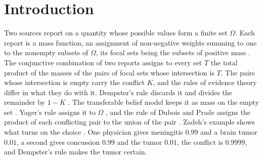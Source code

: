 \section{Introduction}\label{sec:intro}

Two sources report on a quantity whose possible values form a finite set $\Omega$. Each report is a mass function, an assignment of non-negative weights summing to one to the nonempty subsets of $\Omega$, its focal sets being the subsets of positive mass \cite{dempster1967, shafer1976}. The conjunctive combination of two reports assigns to every set $T$ the total product of the masses of the pairs of focal sets whose intersection is $T$. The pairs whose intersection is empty carry the conflict $K$, and the rules of evidence theory differ in what they do with it. Dempster's rule discards it and divides the remainder by $1 - K$ \cite{dempster1967, shafer1976}. The transferable belief model keeps it as mass on the empty set \cite{smets1994}. Yager's rule assigns it to $\Omega$ \cite{yager1987}, and the rule of Dubois and Prade assigns the product of each conflicting pair to the union of the pair \cite{dubois1988}. Zadeh's example shows what turns on the choice \cite{zadeh1984}. One physician gives meningitis $0.99$ and a brain tumor $0.01$, a second gives concussion $0.99$ and the tumor $0.01$, the conflict is $0.9999$, and Dempster's rule makes the tumor certain.

